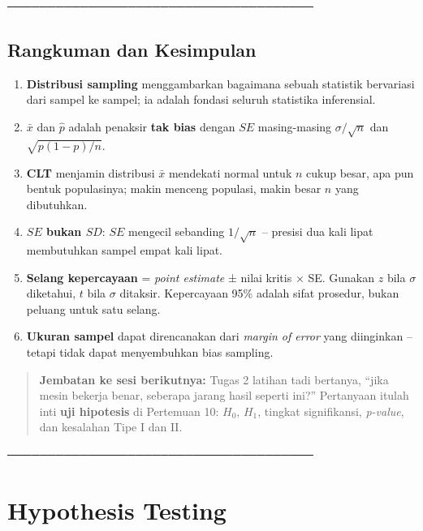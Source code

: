 \documentclass[
  indonesian,
  letterpaper,
]{book}
\begin{document}
──────────────────────────────────────

\section{Rangkuman dan Kesimpulan}\label{rangkuman-dan-kesimpulan}

\begin{enumerate}
\def\labelenumi{\arabic{enumi}.}
\item
  \textbf{Distribusi sampling} menggambarkan bagaimana sebuah statistik
  bervariasi dari sampel ke sampel; ia adalah fondasi seluruh statistika
  inferensial.
\item
  \(\bar{x}\) dan \(\hat{p}\) adalah penaksir \textbf{tak bias} dengan
  \(SE\) masing-masing \(\sigma/\sqrt{n}\) dan \(\sqrt{p(1-p)/n}\).
\item
  \textbf{CLT} menjamin distribusi \(\bar{x}\) mendekati normal untuk
  \(n\) cukup besar, apa pun bentuk populasinya; makin menceng populasi,
  makin besar \(n\) yang dibutuhkan.
\item
  \textbf{\(SE\) bukan \(SD\)}: \(SE\) mengecil sebanding \(1/\sqrt{n}\)
  -- presisi dua kali lipat membutuhkan sampel empat kali lipat.
\item
  \textbf{Selang kepercayaan} = \emph{point estimate} ± nilai kritis ×
  SE. Gunakan \(z\) bila \(\sigma\) diketahui, \(t\) bila \(\sigma\)
  ditaksir. Kepercayaan 95\% adalah sifat prosedur, bukan peluang untuk
  satu selang.
\item
  \textbf{Ukuran sampel} dapat direncanakan dari \emph{margin of error}
  yang diinginkan -- tetapi tidak dapat menyembuhkan bias sampling.
\end{enumerate}

\begin{quote}
\textbf{Jembatan ke sesi berikutnya:} Tugas 2 latihan tadi bertanya,
``jika mesin bekerja benar, seberapa jarang hasil seperti ini?''
Pertanyaan itulah inti \textbf{uji hipotesis} di Pertemuan 10: \(H_0\),
\(H_1\), tingkat signifikansi, \emph{p-value}, dan kesalahan Tipe I dan
II.
\end{quote}

──────────────────────────────────────


\chapter{Hypothesis Testing}\label{hypothesis-testing}
\end{document}
